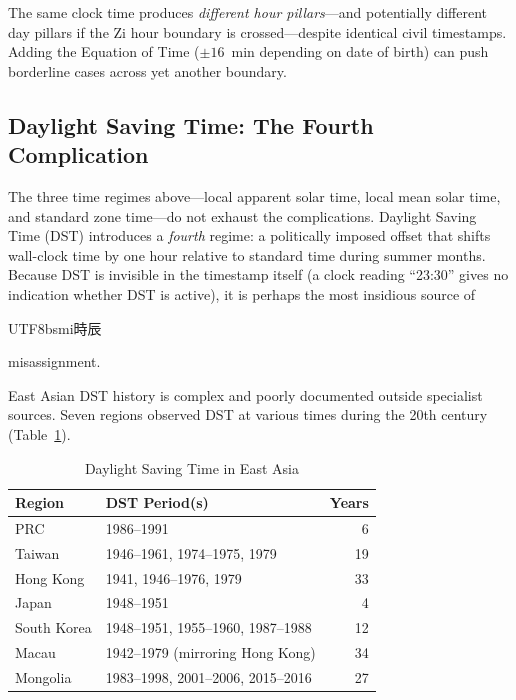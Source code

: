 \documentclass[10pt,a4paper]{article}
\newcommand{\zh}[1]{\begin{CJK}{UTF8}{bsmi}#1\end{CJK}}
\begin{document}
\noindent
The same clock time produces \emph{different hour pillars}---and potentially
different day pillars if the Zi hour boundary is crossed---despite
identical civil timestamps. Adding the Equation of Time ($\pm 16$~min
depending on date of birth) can push borderline cases across yet another
boundary.

\subsection{Daylight Saving Time: The Fourth Complication}
\label{subsec:dst}

The three time regimes above---local apparent solar time, local mean solar
time, and standard zone time---do not exhaust the complications.  Daylight
Saving Time (DST) introduces a \emph{fourth} regime: a politically imposed
offset that shifts wall-clock time by one hour relative to standard time
during summer months.  Because DST is invisible in the timestamp itself (a
clock reading ``23:30'' gives no indication whether DST is active), it is
perhaps the most insidious source of \zh{時辰} misassignment.

East Asian DST history is complex and poorly documented outside
specialist sources.  Seven regions observed DST at various times during
the 20th century~\cite{iana_tzdata_asia, dst_east_asia_research}
(Table~\ref{tab:dst_history}).

\begin{table}[H]
\centering
\caption{Daylight Saving Time in East Asia}
\label{tab:dst_history}
\small
\begin{tabular}{@{}llr@{}}
\toprule
\textbf{Region} & \textbf{DST Period(s)} & \textbf{Years} \\
\midrule
PRC             & 1986--1991                              & 6  \\
Taiwan          & 1946--1961, 1974--1975, 1979             & 19 \\
Hong Kong       & 1941, 1946--1976, 1979                   & 33 \\
Japan           & 1948--1951                               & 4  \\
South Korea     & 1948--1951, 1955--1960, 1987--1988       & 12 \\
Macau           & 1942--1979 (mirroring Hong Kong)         & 34 \\
Mongolia        & 1983--1998, 2001--2006, 2015--2016       & 27 \\
\bottomrule
\end{tabular}
\end{table}
\end{document}
